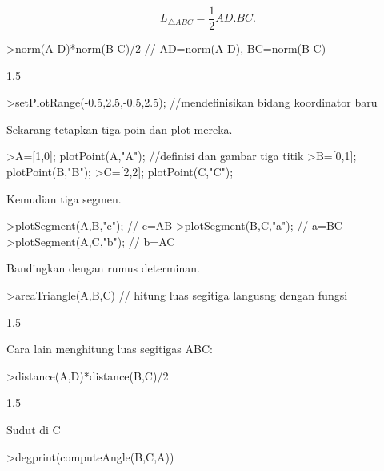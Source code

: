 \documentclass{article}
\begin{document}
\begin{eulernotebook}
\begin{eulercomment}
\end{eulercomment}
\begin{eulerformula}
\[
L_{\triangle ABC}= \frac{1}{2}AD.BC.
\]
\end{eulerformula}
\begin{eulerprompt}
>norm(A-D)*norm(B-C)/2 // AD=norm(A-D), BC=norm(B-C)
\end{eulerprompt}
\begin{euleroutput}
  1.5
\end{euleroutput}
\begin{eulerprompt}
>setPlotRange(-0.5,2.5,-0.5,2.5); //mendefinisikan bidang koordinator baru
\end{eulerprompt}
\begin{eulercomment}
Sekarang tetapkan tiga poin dan plot mereka.
\end{eulercomment}
\begin{eulerprompt}
>A=[1,0]; plotPoint(A,"A"); //definisi dan gambar tiga titik
>B=[0,1]; plotPoint(B,"B");
>C=[2,2]; plotPoint(C,"C");
\end{eulerprompt}
\begin{eulercomment}
Kemudian tiga segmen.
\end{eulercomment}
\begin{eulerprompt}
>plotSegment(A,B,"c"); // c=AB
>plotSegment(B,C,"a"); // a=BC
>plotSegment(A,C,"b"); // b=AC
\end{eulerprompt}
\begin{eulercomment}
Bandingkan dengan rumus determinan.
\end{eulercomment}
\begin{eulerprompt}
>areaTriangle(A,B,C) // hitung luas segitiga langusng dengan fungsi
\end{eulerprompt}
\begin{euleroutput}
  1.5
\end{euleroutput}
\begin{eulercomment}
Cara lain menghitung luas segitigas ABC:
\end{eulercomment}
\begin{eulerprompt}
>distance(A,D)*distance(B,C)/2
\end{eulerprompt}
\begin{euleroutput}
  1.5
\end{euleroutput}
\begin{eulercomment}
Sudut di C
\end{eulercomment}
\begin{eulerprompt}
>degprint(computeAngle(B,C,A))
\end{eulerprompt}

\end{eulernotebook}
\end{document}
